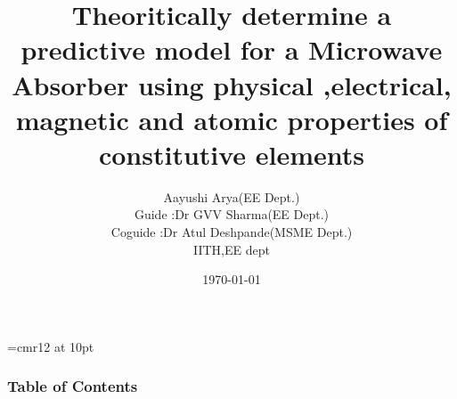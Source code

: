 \documentclass[11pt,aspect ratio=169]{beamer}
\begin{document}
	


	\font\myfont=cmr12 at 10pt
	  
	\title{ \myfont Theoritically determine a predictive model for a Microwave Absorber using  physical ,electrical, magnetic and atomic  properties of constitutive elements }
		\author{	\scriptsize Aayushi Arya(EE Dept.) \\
		\scriptsize	Guide :Dr GVV Sharma(EE Dept.) \\
			\scriptsize	Coguide :Dr Atul Deshpande(MSME Dept.) \\
		\scriptsize	IITH,EE dept \\
	}



	\date[\tiny \today]{ \tiny \today}
	\begin{frame}[t]
		\maketitle
		
	\end{frame}
\begin{frame}
	\frametitle{Table of Contents}
	\tableofcontents
	\end{frame}
\end{document}
